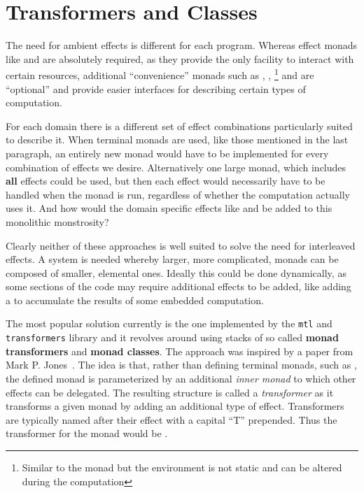 \section{Transformers and Classes}

\label{sec:transformers}

The need for ambient effects is different for each program. Whereas effect
monads like \IOM{} and \HandlerForM{} are absolutely required, as they provide
the only facility to interact with certain resources, additional ``convenience''
monads such as \ReaderM{}, \WriterM{}, \StateM{}\footnote{Similar to the
  \ReaderM{} monad but the environment is not static and can be altered during
  the computation} and \ExceptM{} are ``optional'' and provide easier interfaces
for describing certain types of computation.

For each domain there is a different set of effect combinations particularly
suited to describe it. When terminal monads are used, like those mentioned in
the last paragraph, an entirely new monad would have to be implemented for every
combination of effects we desire. Alternatively one large monad, which includes
\textbf{all} effects could be used, but then each effect would necessarily have
to be handled when the monad is run, regardless of whether the computation
actually uses it. And how would the domain specific effects like \IOM{} and
\HandlerForM{} be added to this monolithic monstrosity?

Clearly neither of these approaches is well suited to solve the need for
interleaved effects. A system is needed whereby larger, more complicated, monads
can be composed of smaller, elemental ones. Ideally this could be done
dynamically, as some sections of the code may require additional effects to be
added, like adding a \WriterM{} to accumulate the results of some embedded
computation.

The most popular solution currently is the one implemented by the
\texttt{mtl}\cite{mtl} and \texttt{transformers}\cite{transformers} library and
it revolves around using stacks of so called \textbf{monad transformers} and
\textbf{monad classes}. The approach was inspired by a paper from Mark P.
Jones~\cite{transformer-inspiration}. The idea is that, rather than defining
terminal monads, such as \ReaderM{}, the defined monad is parameterized by an
additional \emph{inner monad} to which other effects can be delegated. The
resulting structure is called a \emph{transformer} as it transforms a given
monad by adding an additional type of effect. Transformers are typically named
after their effect with a capital ``T'' prepended. Thus the transformer for the
\ReaderM{} monad would be \ReaderT{}.

